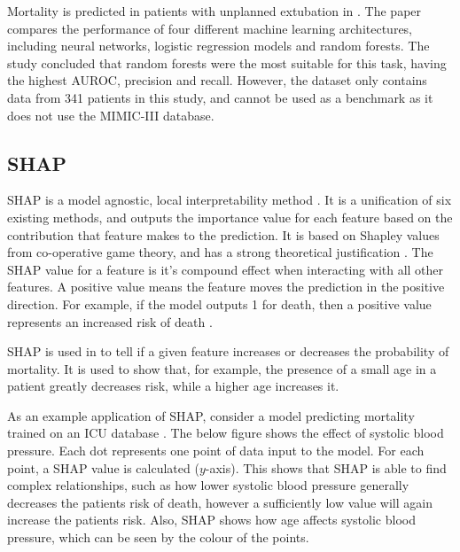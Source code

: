 \documentclass[12pt]{article}
\begin{document}
Mortality is predicted in patients with unplanned extubation in \cite{CompareFourML}. The paper compares the performance of four different machine learning architectures, including neural networks, logistic regression models and random forests. The study concluded that random forests were the most suitable for this task, having the highest AUROC, precision and recall. However, the dataset only contains data from 341 patients in this study, and cannot be used as a benchmark as it does not use the MIMIC-III database. 

\subsection{SHAP}
\label{SHAP Intro}
SHAP is a model agnostic, local interpretability method \cite{SHAP}. It is a unification of six existing methods, and outputs the importance value for each feature based on the contribution that feature makes to the prediction. It is based on Shapley values from co-operative game theory, and has a strong theoretical justification \cite{YoungKyle2019Dnno,ICUFancyLSTM}. The SHAP value for a feature is it's compound effect when interacting with all other features. A positive value means the feature moves the prediction in the positive direction. For example, if the model outputs 1 for death, then a positive value represents an increased risk of death \cite{SHAPInteraction}.

SHAP is used in \cite{ICUFancyLSTM} to tell if a given feature increases or decreases the probability of mortality. It is used to show that, for example, the presence of a small age in a patient greatly decreases risk, while a higher age increases it. 

As an example application of SHAP, consider a model predicting mortality trained on an ICU database \cite{SHAPInteraction}. The below figure shows the effect of systolic blood pressure. Each dot represents one point of data input to the model. For each point, a SHAP value is calculated ($y$-axis). This shows that SHAP is able to find complex relationships, such as how lower systolic blood pressure generally decreases the patients risk of death, however a sufficiently low value will again increase the patients risk. Also, SHAP shows how age affects systolic blood pressure, which can be seen by the colour of the points. 
\end{document}
